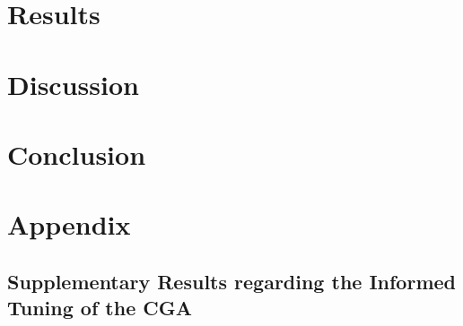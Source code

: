 \documentclass[10pt]{article}
\begin{document}
\section{Results}
\section{Discussion}
\section{Conclusion}

\newpage
\section{Appendix}
\subsection{Supplementary Results regarding the Informed Tuning of the CGA}
\end{document}
